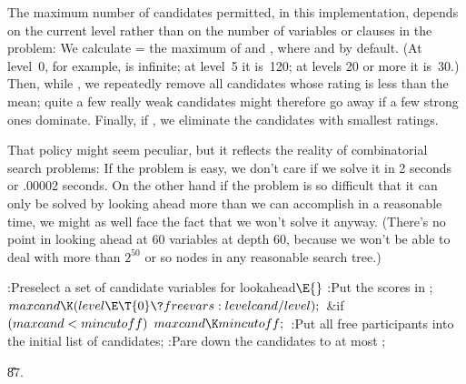The maximum number of candidates permitted, in this implementation,
depends on the current level rather than on the number of variables
or clauses in the problem: We calculate  = the maximum
of  and , where  and
 by default. (At level~0, for example,  is
infinite; at level~5 it is~120; at levels 20 or more it is~30.)
Then, while , we repeatedly remove all
candidates whose
rating is less than the mean; quite a few really weak candidates might
therefore go away if a few strong ones dominate. Finally, if
, we eliminate the 
candidates with smallest ratings.

That policy might seem peculiar, but it reflects the reality of
combinatorial search problems: If the problem is easy, we don't
care if we solve it in 2 seconds or .00002 seconds. On the other hand
if the problem is so difficult that it can only be solved
by looking ahead more than we can accomplish in a reasonable time,
we might as well face the fact that we won't solve it anyway.
(There's no point in looking ahead at 60 variables at depth 60,
because we won't be able to deal with more than $2^{50}$ or so
nodes in any reasonable search tree.)

\Y\B\4:Preselect a set of candidate variables for lookahead\X${}\E{}$\6
:Put the scores in \X;\6
${}\\{maxcand}\K(\\{level}\E\T{0}\?\\{freevars}:\\{levelcand}/\\{level});{}$\6
\&{if} ${}(\\{maxcand}<\\{mincutoff}){}$\1\5
${}\\{maxcand}\K\\{mincutoff};{}$\2\6
:Put all free participants into the initial list of candidates\X;\6
:Pare down the candidates to at most \X;\par
\U87.\fi

